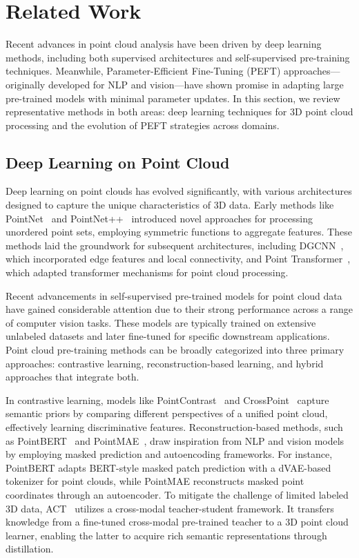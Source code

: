 \section{Related Work}
\label{sec:relatedwork}

Recent advances in point cloud analysis have been driven by deep learning methods, including both supervised architectures and self-supervised pre-training techniques. Meanwhile, Parameter-Efficient Fine-Tuning (PEFT) approaches—originally developed for NLP and vision—have shown promise in adapting large pre-trained models with minimal parameter updates. In this section, we review representative methods in both areas: deep learning techniques for 3D point cloud processing and the evolution of PEFT strategies across domains.

\subsection{Deep Learning on Point Cloud}

Deep learning on point clouds has evolved significantly, with various architectures designed to capture the unique characteristics of 3D data. Early methods like PointNet~\cite{qi2017pointnet} and PointNet++~\cite{qi2017pointnet++} introduced novel approaches for processing unordered point sets, employing symmetric functions to aggregate features. These methods laid the groundwork for subsequent architectures, including DGCNN~\cite{wang2019dynamic}, which incorporated edge features and local connectivity, and Point Transformer~\cite{zhao2021point}, which adapted transformer mechanisms for point cloud processing.

Recent advancements in self-supervised pre-trained models for point cloud data have gained considerable attention due to their strong performance across a range of computer vision tasks. These models are typically trained on extensive unlabeled datasets and later fine-tuned for specific downstream applications. Point cloud pre-training methods can be broadly categorized into three primary approaches: contrastive learning, reconstruction-based learning, and hybrid approaches that integrate both.

In contrastive learning, models like PointContrast~\cite{xie2020pointcontrast} and CrossPoint~\cite{afham2022crosspoint} capture semantic priors by comparing different perspectives of a unified point cloud, effectively learning discriminative features. Reconstruction-based methods, such as PointBERT~\cite{yu2022point} and PointMAE~\cite{pang2022masked}, draw inspiration from NLP and vision models by employing masked prediction and autoencoding frameworks. For instance, PointBERT adapts BERT-style masked patch prediction with a dVAE-based tokenizer for point clouds, while PointMAE reconstructs masked point coordinates through an autoencoder. To mitigate the challenge of limited labeled 3D data, ACT~\cite{dong2022autoencoders} utilizes a cross-modal teacher-student framework. It transfers knowledge from a fine-tuned cross-modal pre-trained teacher to a 3D point cloud learner, enabling the latter to acquire rich semantic representations through distillation.

